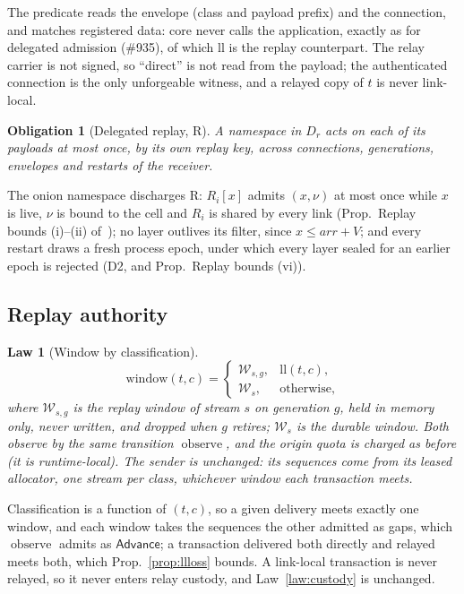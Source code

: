 \documentclass[journal]{IEEEtran}
\newtheorem{law}{Law}
\newtheorem{obligation}{Obligation}
\newcommand{\obs}{\operatorname{observe}}
\newcommand{\W}{\mathcal{W}}
\newcommand{\issue}[1]{\#{#1}}
\begin{document}
The predicate reads the envelope (class and payload prefix) and the connection, and matches
registered data: core never calls the application, exactly as for delegated admission
(\issue{935}), of which $\mathrm{ll}$ is the replay counterpart.  The relay carrier is not
signed, so ``direct'' is not read from the payload; the authenticated connection is the only
unforgeable witness, and a relayed copy of $t$ is never link-local.

\begin{obligation}[Delegated replay, R]\label{ob:delegated}
A namespace in $D_r$ acts on each of its payloads at most once, by its own replay key,
across connections, generations, envelopes and restarts of the receiver.
\end{obligation}

The onion namespace discharges R: $R_i[x]$ admits $(x,\nu)$ at most once while $x$ is live,
$\nu$ is bound to the cell and $R_i$ is shared by every link (Prop.~Replay bounds (i)--(ii)
of~\cite{OnionPipeline}); no layer outlives its filter, since $x\le\mathit{arr}+V$; and every
restart draws a fresh process epoch, under which every layer sealed for an earlier epoch is
rejected (D2, and Prop.~Replay bounds (vi)).

\subsection{Replay authority}

\begin{law}[Window by classification]\label{law:linklocal}
\[
\mathrm{window}(t,c)=
\begin{cases}
\W_{s,g}, & \mathrm{ll}(t,c),\\
\W_s, & \text{otherwise,}
\end{cases}
\]
where $\W_{s,g}$ is the replay window of stream $s$ on generation $g$, held in memory only,
never written, and dropped when $g$ retires; $\W_s$ is the durable window.  Both observe by
the same transition $\obs$, and the origin quota is charged as before (it is runtime-local).
The sender is unchanged: its sequences come from its leased allocator, one stream per
class, whichever window each transaction meets.
\end{law}

Classification is a function of $(t,c)$, so a given delivery meets exactly one window, and
each window takes the sequences the other admitted as gaps, which $\obs$ admits as
$\mathsf{Advance}$; a transaction delivered both directly and relayed meets both, which
Prop.~\ref{prop:llloss} bounds.  A link-local transaction is never
relayed, so it never enters relay custody, and Law~\ref{law:custody} is unchanged.
\end{document}
